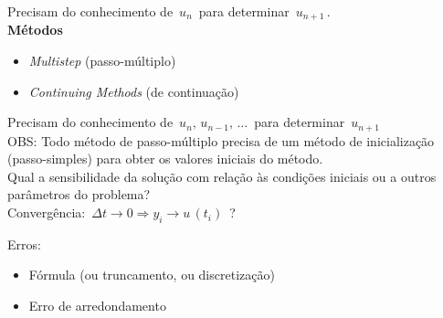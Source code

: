 Precisam do conhecimento de $ \, u_n \, $ para determinar $ \, u_{n+1} \, $.\\

\textbf{Métodos}

\begin{itemize}

\item \textit{Multistep} (passo-múltiplo)

\item \textit{Continuing Methods} (de continuação)

\end{itemize}

Precisam do conhecimento de $ \, u_n, \, u_{n-1}, \, \ldots \, $ para determinar $ \, u_{n+1} \, $\\

OBS: Todo método de passo-múltiplo precisa de um método de inicialização (passo-simples) para obter os valores iniciais do método.\\

Qual a sensibilidade da solução com relação às condições iniciais ou a outros parâmetros do problema?\\

Convergência: $ \, \Delta t \rightarrow 0 \Rightarrow y_i \rightarrow u \, (t_i) \, $ ?

Erros:

\begin{itemize}

\item Fórmula (ou truncamento, ou discretização)

\item Erro de arredondamento

\end{itemize}
